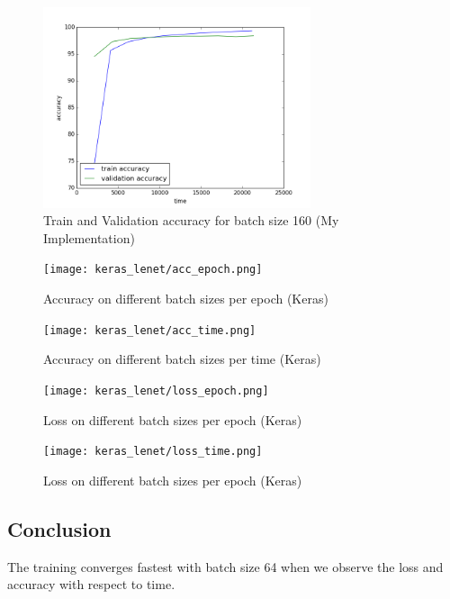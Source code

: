 \documentclass{article}
\begin{document}
\begin{figure}[h]
  \centering
  \includegraphics[width=0.7\textwidth]{accuracy.png}
  \caption{Train and Validation accuracy for batch size 160 (My Implementation)}
\end{figure}

\begin{figure}[h]
  \centering
  \texttt{[image: keras\_lenet/acc\_epoch.png]}
  \caption{Accuracy on different batch sizes per epoch (Keras)}
\end{figure}

\begin{figure}[h]
  \centering
  \texttt{[image: keras\_lenet/acc\_time.png]}
  \caption{Accuracy on different batch sizes per time (Keras)}
\end{figure}

\begin{figure}[h]
  \centering
  \texttt{[image: keras\_lenet/loss\_epoch.png]}
  \caption{Loss on different batch sizes per epoch (Keras)}
\end{figure}

\begin{figure}[h]
  \centering
  \texttt{[image: keras\_lenet/loss\_time.png]}
  \caption{Loss on different batch sizes per epoch (Keras)}
\end{figure}

\subsection{Conclusion}
The training converges fastest with batch size 64 when we observe the
loss and accuracy with respect to time.
\end{document}
